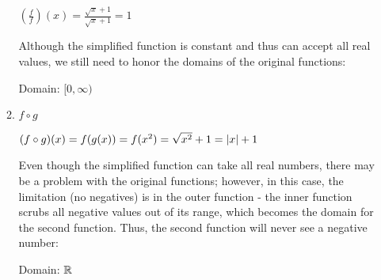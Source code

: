 \documentclass[letterpaper,12pt,fleqn]{article}
\begin{document}
\begin{enumerate}
\begin{enumerate}
    $\left(\frac{f}{f}\right)(x)=\frac{\sqrt{x}+1}{\sqrt{x}+1}=1$

    Although the simplified function is constant and thus can accept all real
    values, we still need to honor the domains of the original functions:

    Domain: $[0,\infty)$

  \item $f\circ g$
      
    $(f\circ g)(x)=f(g(x))=f(x^2)=\sqrt{x^2}+1=\lvert x\rvert+1$

    Even though the simplified function can take all real numbers, there may
    be a problem with the original functions; however, in this case, the
    limitation (no negatives) is in the outer function - the inner function
    scrubs all negative values out of its range, which becomes the domain for
    the second function. Thus, the second function will never see a negative
    number:

    Domain: $\mathbb{R}$
  \end{enumerate}
  
\end{enumerate}
\end{document}
